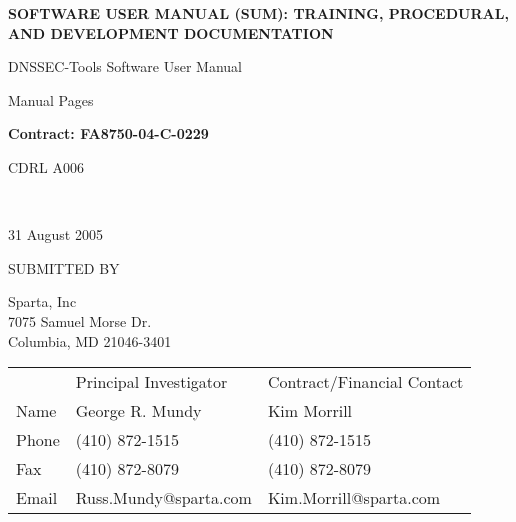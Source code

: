 \documentclass[12pt]{article}
\begin{document}

\begin{titlepage}

\vspace{.5in}

\begin{center}
\LARGE{\bf
SOFTWARE USER MANUAL (SUM):
TRAINING, PROCEDURAL, AND
DEVELOPMENT DOCUMENTATION
}
\vspace{1in}

\Large{
DNSSEC-Tools Software User Manual

Manual Pages
\vspace{0.5in}

{\bf Contract: FA8750-04-C-0229
\vspace{0.125in}

CDRL A006}\\
}
31 August 2005
\end{center}

\vspace{.5in}

SUBMITTED BY

Sparta, Inc\\
7075 Samuel Morse Dr.\\
Columbia, MD 21046-3401
\vspace{0.25in}

\begin{table}[hb]
\begin{tabular}{lll}
	& Principal Investigator	& Contract/Financial Contact\\
Name	& George R. Mundy		& Kim Morrill\\
Phone	& (410) 872-1515		& (410) 872-1515\\
Fax	& (410) 872-8079		& (410) 872-8079\\
Email	& Russ.Mundy@sparta.com		& Kim.Morrill@sparta.com\\
\end{tabular}
\end{table}

\end{titlepage}


\end{document}
